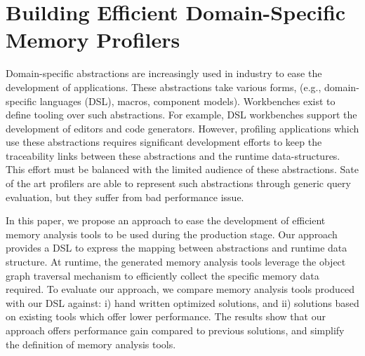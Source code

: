\chapter{Building Efficient Domain-Specific Memory Profilers}

Domain-specific abstractions are increasingly used in industry to ease the development of applications. These abstractions take various forms, (e.g., domain-specific languages (DSL), macros, component models). Workbenches exist to define tooling over such abstractions. For example, DSL workbenches support the development of editors and code generators. 
However, profiling applications which use these abstractions requires significant development efforts to keep the traceability links between these abstractions and the runtime data-structures. This effort must be balanced with the limited audience of these abstractions. 
Sate of the art profilers are able to represent such abstractions through generic query evaluation, but they suffer from bad performance issue. 

In this paper, we propose an approach to ease the development of efficient memory analysis tools to be used during the production stage.
Our approach provides a DSL to express the mapping between abstractions and runtime data structure.
At runtime, the generated  memory analysis tools leverage the object graph traversal mechanism to efficiently collect the specific memory data required.
To evaluate our approach, we compare memory analysis tools produced with our DSL against: i) hand written optimized solutions, and ii) solutions based on existing tools which offer lower performance.
The results show that our approach offers performance gain compared to previous solutions, and simplify the definition of memory analysis tools.





%











%

